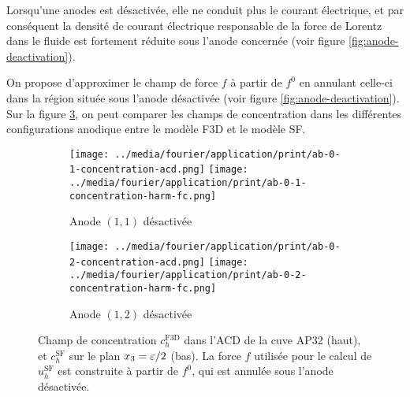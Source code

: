 Lorsqu'une anodes est désactivée, elle ne conduit plus le courant
électrique, et par conséquent la densité de courant électrique
responsable de la force de Lorentz dans le fluide est fortement
réduite sous l'anode concernée (voir figure \ref{fig:anode-deactivation}).

On propose d'approximer le champ de force $f$ à partir de $f^0$ en
annulant celle-ci dans la région située sous l'anode désactivée (voir
figure \ref{fig:anode-deactivation}). Sur la figure
\ref{fig:harmonic-concentration-comp-fc}, on peut comparer les champs
de concentration dans les différentes configurations anodique entre le
modèle F3D et le modèle SF.


\begin{figure}
\begin{center}
\begin{subfigure}[t]{\textwidth}
  \texttt{[image: ../media/fourier/application/print/ab-0-1-concentration-acd.png]}
  \texttt{[image: ../media/fourier/application/print/ab-0-1-concentration-harm-fc.png]}
  \caption{Anode $(1,1)$ désactivée}
  \label{}
\end{subfigure}

\begin{subfigure}[t]{\textwidth}
  \texttt{[image: ../media/fourier/application/print/ab-0-2-concentration-acd.png]}
  \texttt{[image: ../media/fourier/application/print/ab-0-2-concentration-harm-fc.png]}
  \caption{Anode $(1,2)$ désactivée}
  \label{}
\end{subfigure}


        \caption{Champ de concentration $c_h^\mathrm{F3D}$ dans l'ACD de
      la cuve AP32 (haut), et $c_h^\mathrm{SF}$ sur le plan
      $x_3 = \varepsilon / 2$ (bas). La force $f$ utilisée
      pour le calcul de $u_h^\mathrm{SF}$  est construite à
      partir de $f^0$, qui est annulée sous l'anode désactivée.}
\label{fig:harmonic-concentration-comp-fc}
\end{center}
\end{figure}

